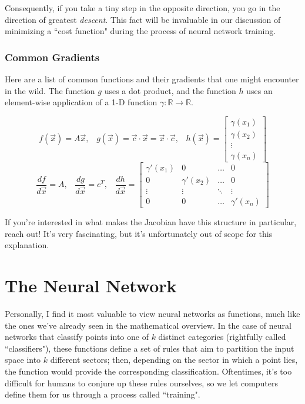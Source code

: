 \documentclass{article}
\begin{document}
Consequently, if you take a tiny step in the opposite direction, you go in the direction of greatest \textit{descent}. This fact will be invaluable in our discussion of minimizing a ``cost function" during the process of neural network training.

\newpage

\subsubsection{Common Gradients}
 Here are a list of common functions and their gradients that one might encounter in the wild. The function $g$ uses a dot product, and the function $h$ uses an element-wise application of a 1-D function $\gamma: \mathbb{R} \to \mathbb{R}$.

\[f\left(\vec{x}\right) = A\vec{x}, \;\;\; g\left(\vec{x}\right) = \vec{c} \cdot \vec{x} = \vec{x} \cdot \vec{c}, \;\;\; h\left(\vec{x}\right) = \begin{bmatrix}\gamma(x_1) \\ \gamma(x_2) \\ \vdots \\ \gamma(x_n)\end{bmatrix}\]
\[\frac{df}{d\vec{x}} = A, \;\;\; \frac{dg}{d\vec{x}} = c^{T}, \;\;\; \frac{dh}{d\vec{x}} = \begin{bmatrix}\gamma'(x_1) & 0 & \hdots & 0 \\
0 & \gamma'(x_2) & \hdots & 0 \\
\vdots & \vdots & \ddots &\vdots\\
0 & 0 & \hdots & \gamma'(x_n)
\end{bmatrix}\]

If you're interested in what makes the Jacobian have this structure in particular, reach out! It's very fascinating, but it's unfortunately out of scope for this explanation.

\section{The Neural Network}

Personally, I find it most valuable to view neural networks as functions, much like the ones we've already seen in the mathematical overview. In the case of neural networks that classify points into one of $k$ distinct categories (rightfully called ``classifiers"), these functions define a set of rules that aim to partition the input space into $k$ different sectors; then, depending on the sector in which a point lies, the function would provide the corresponding classification. Oftentimes, it's too difficult for humans to conjure up these rules ourselves, so we let computers define them for us through a process called ``training". \\
\end{document}

